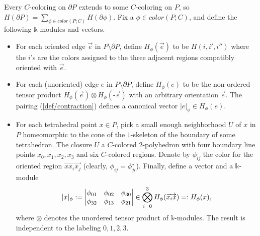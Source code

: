 \begin{definition}\label{def/shadow-state-sum}
  Every $C$-coloring on $\partial P$ extends to some $C$-coloring
  on $P$, so
  $H(\partial P) = \sum_{\phi \in color(P; C)} H(\partial \phi)$.
  Fix a $\phi \in color(P; C)$, and define the following
  $\mathbb{k}$-modules and vectors.
\begin{itemize}
  \item For each oriented edge $\vec{e}$ in
        $P \setminus \partial P$, define $H_{\phi}(\vec{e})$ to
        be $H(i,i',i'')$ where the $i$'s are the colors assigned
        to the three adjacent regions compatibly oriented with
        $\vec{e}$.
  \item For each (unoriented) edge $e$ in
        $P \setminus \partial P$, define $H_{\phi}(e)$ to be the
        non-ordered tensor product
        $H_{\phi}(\vec{e}) \otimes H_{\phi}(\text{-}\vec{e})$
        with an arbitrary orientation $\vec{e}$. The pairing
        (\ref{def/contraction}) defines a canonical vector
        $|e|_{\phi} \in H_{\phi}(e)$.
  \item For each tetrahedral point $x \in P$, pick a small enough
        neighborhood $U$ of $x$ in $P$ homeomorphic to the cone
        of the $1$-skeleton of the boundary of some tetrahedron.
        The closure $\overline{U}$ a $C$-colored $2$-polyhedron
        with four boundary line points
        $x_{0}, x_{1}, x_{2}, x_{3}$ and six $C$-colored regions.
        Denote by $\phi_{ij}$ the color for the oriented region
        $\overrightarrow{xx_{i}x_{j}}$ (clearly,
        $\phi_{ij} = \phi_{ji}^{\star}$). Finally, define a
        vector and a $\mathbb{k}$-module 
        $$|x|_{\phi} := \begin{vmatrix} \phi_{01} & \phi_{02} & \phi_{30} \\ \phi_{32} & \phi_{13} & \phi_{21} \\ \end{vmatrix} \in \bigotimes_{i=0}^{3} H_{\phi}(\overrightarrow{x_{i}x}) =: H_{\phi}(x),$$
        where $\otimes$ denotes the unordered tensor product of
        $\mathbb{k}$-modules. The result is independent to the
        labeling $0, 1, 2, 3$.
\end{itemize}


\end{definition}

